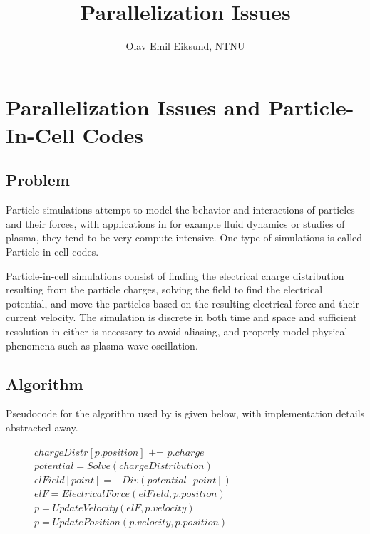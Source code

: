 \documentclass[twocolumn]{article} %
\title{Parallelization Issues}
\author{Olav Emil Eiksund, NTNU}
\date{} %
\begin{document}
\twocolumn[\maketitle]


\section*{Parallelization Issues and Particle-In-Cell Codes}
	\subsection*{Problem}
		Particle simulations attempt to model the behavior and interactions of particles and their forces, with applications
		in for example fluid dynamics or studies of plasma, they tend to be very compute intensive. One type of simulations is
		called Particle-in-cell codes.
		
		Particle-in-cell simulations consist of finding the electrical charge distribution resulting from the particle charges,
		solving the field to find the electrical potential, and move the particles based on the resulting electrical force and
		their current velocity. The simulation is discrete in both time and space and sufficient resolution in either is
		necessary to avoid aliasing, and properly model physical phenomena such as plasma wave oscillation.
	
	\subsection*{Algorithm}
		Pseudocode for the algorithm used by \cite{elster94} is given below, with implementation details abstracted away. \\
		\begin{figure}[h]
		\begin{algorithmic}
					\State $chargeDistr[p.position] \text{ += } p.charge$
				\EndFor
				\State $potential = Solve(chargeDistribution)$
				\State
					\State $elField[point] = -Div(potential[point])$
				\EndFor
					\State $elF = ElectricalForce(elField, p.position)$
					\State $p = UpdateVelocity(elF, p.velocity)$
					\State $p = UpdatePosition(p.velocity, p.position)$
				\EndFor
			\EndWhile
		\end{algorithmic}
		\end{figure}
		
\end{document}
